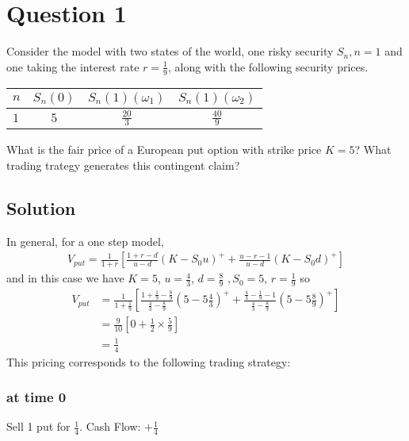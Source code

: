 \documentclass{unswmaths}
\begin{document}
\setlength\parindent{0pt}

\fancyfoot[r]{\today}

\section*{Question 1}
Consider the model with two states of the world, one risky security $ S_n, n= 1 $
and one taking the interest rate $ r = \frac{1}{9} $, along with the following security prices.
\begin{table}[h]
	\centering
	\begin{tabular}{|l|c|c|c|}
		\hline
		$ n $ & $ S_n(0) $ & $ S_n(1)(\omega_1) $ & $ S_n(1)(\omega_2) $ \\
		\hline
		$ 1 $ & $ 5 $ & $ \frac{20}{3} $ & $ \frac{40}{9} $ \\
		\hline
	\end{tabular}
\end{table}
What is the fair price of a European put option with strike price $ K = 5$?
What trading trategy generates this contingent claim?

\subsection*{Solution}
In general, for a one step model,
\begin{align*}
	V_{put} = \frac{1}{1+r} \left[ \frac{1+r-d}{u-d} \left( K - S_0 u \right)^+ 
		+ \frac{u-r-1}{u-d} \left( K - S_0 d \right)^+ \right]
\end{align*}
and in this case we have $ K = 5 $, $ u = \frac{4}{3} $, $ d = \frac{8}{9} $ $, S_0 = 5 $, $ r = \frac{1}{9} $ so
\begin{align*}
	V_{put} &= \frac{1}{1+\frac{1}{9}} \left[ \frac{1+\frac{1}{9}-\frac{8}{9}}{\frac{4}{3}-\frac{8}{9}} \left( 5 - 5 \frac{4}{3} \right)^+ 
		+ \frac{\frac{4}{3}-\frac{1}{9}-1}{\frac{4}{3}-\frac{8}{9}} \left( 5 - 5 \frac{8}{9} \right)^+ \right] \\
		&= \frac{9}{10}\left[ 0 + \frac{1}{2} \times \frac{5}{9} \right] \\
		&= \frac{1}{4}
\end{align*}
This pricing corresponds to the following trading strategy:
\subsubsection*{at time 0}
Sell 1 put for $ \frac{1}{4} $. \hfill Cash Flow: $+\frac{1}{4}$ 
\end{document}
